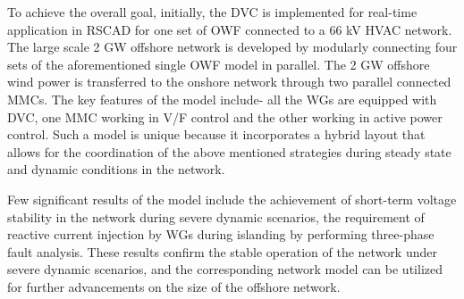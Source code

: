 To achieve the overall goal, initially, the \gls{DVC} is implemented for real-time application in RSCAD for one set of \gls{OWF} connected to a 66 kV \gls{HVAC} network. The large scale 2 GW offshore network is developed by modularly connecting four sets of the aforementioned single \gls{OWF} model in parallel. The 2 GW offshore wind power is transferred to the onshore network through two parallel connected \gls{MMC}s. The key features of the model include- all the \gls{WG}s are equipped with \gls{DVC}, one \gls{MMC} working in V/F control and the other working in active power control. Such a model is unique because it incorporates a hybrid layout that allows for the coordination of the above mentioned strategies during steady state and dynamic conditions in the network.    


Few significant results of the model include the achievement of short-term voltage stability in the network during severe dynamic scenarios, the requirement of reactive current injection by \gls{WG}s during islanding by performing three-phase fault analysis. These results confirm the stable operation of the network under severe dynamic scenarios, and the corresponding network model can be utilized for further advancements on the size of the offshore network.  






